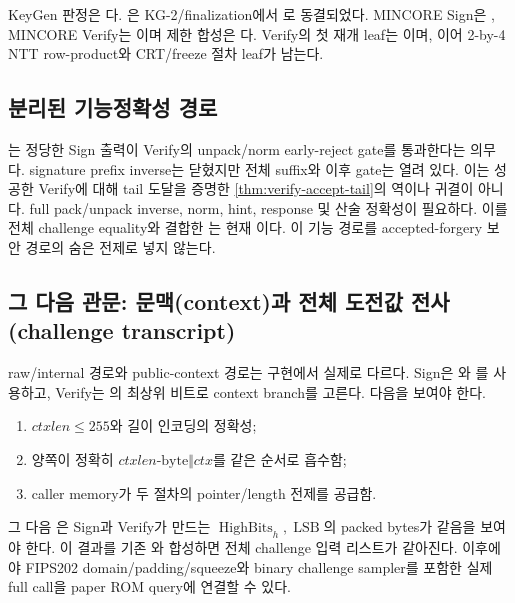 KeyGen 판정은 다. 은
KG-2/finalization에서 \statuspartial 로 동결되었다. MINCORE Sign은
, MINCORE Verify는
이며 제한 합성은 \statusspecified 다.
Verify의 첫 재개 leaf는 이며, 이어
2-by-4 NTT row-product와 CRT/freeze 절차 leaf가 남는다.

\subsection{분리된 기능정확성 경로}

는 정당한 Sign 출력이 Verify의 unpack/norm
early-reject gate를 통과한다는 \statuspartial 의무다. signature prefix inverse는
닫혔지만 전체 suffix와 이후 gate는 열려 있다. 이는 성공한 Verify에
대해 tail 도달을 증명한 \cref{thm:verify-accept-tail}의 역이나 귀결이 아니다.
full pack/unpack inverse, norm, hint, response 및 산술 정확성이 필요하다. 이를
전체 challenge equality와 결합한 는 현재
\statusblocked 이다. 이 기능 경로를 accepted-forgery 보안 경로의 숨은 전제로
넣지 않는다.

\subsection{그 다음 관문: 문맥(context)과 전체 도전값 전사(challenge transcript)}

raw/internal 경로와 public-context 경로는 구현에서 실제로 다르다. Sign은
와 를 사용하고,
Verify는 의 최상위 비트로 context branch를 고른다. 다음을
보여야 한다.

\begin{enumerate}
  \item \(ctxlen\le255\)와 길이 인코딩의 정확성;
  \item 양쪽이 정확히 \(ctxlen\text{-byte}\Vert ctx\)를 같은 순서로 흡수함;
  \item caller memory가 두 절차의 pointer/length 전제를 공급함.
\end{enumerate}

그 다음 은 Sign과 Verify가 만드는
\(\operatorname{HighBits}_h,\operatorname{LSB}\)의 packed bytes가 같음을
보여야 한다. 이 결과를 기존 와
합성하면 전체 challenge 입력 리스트가 같아진다. 이후에야 FIPS202
domain/padding/squeeze와 binary challenge sampler를 포함한 실제 full call을
paper ROM query에 연결할 수 있다.

